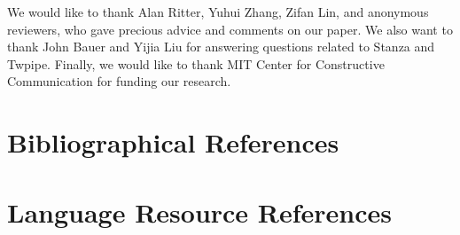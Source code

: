 \documentclass[10pt, a4paper]{article}
\begin{document}
We would like to thank Alan Ritter, Yuhui Zhang, Zifan Lin, and anonymous reviewers, who gave precious advice and comments on our paper. We also want to thank John Bauer and Yijia Liu for answering questions related to Stanza and Twpipe. Finally, we would like to thank MIT Center for Constructive Communication for funding our research.

























\section{Bibliographical References}\label{reference}




\section{Language Resource References}
\label{lr:ref}
\end{document}
